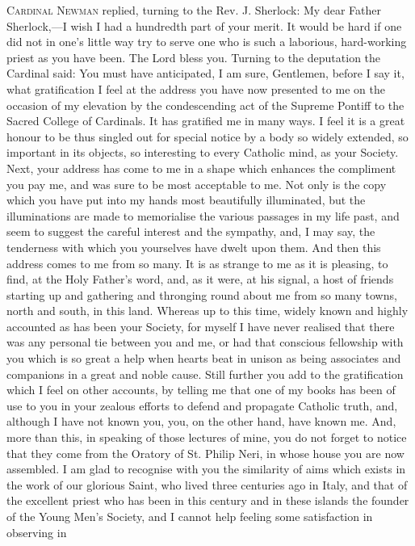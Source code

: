 C\textsc{ardinal} N\textsc{ewman}
replied, turning to the Rev. J. Sherlock: My dear Father Sherlock,—I
wish I had a hundredth part of your merit. It would be hard if one did
not in one's little way try to serve one who is such a laborious,
hard-working priest as you have been. The Lord bless you. Turning to
the deputation the Cardinal said: You must have anticipated, I am
sure, Gentlemen, before I say it, what gratification I feel at the
address you have now presented to me on the occasion of my elevation
by the condescending act of the Supreme Pontiff to the Sacred College
of Cardinals. It has gratified me in many ways. I feel it is a great
honour to be thus singled out for special notice by a body so widely
extended, so important in its objects, so interesting to every
Catholic mind, as your Society. Next, your address has come to me in a
shape which enhances the compliment you pay me, and was sure to be
most acceptable to me. Not only is the copy which you have put into my
hands most beautifully illuminated, but the illuminations are made to
memorialise the various passages in my life past, and seem to suggest
the careful interest and the sympathy, and, I may say, the tenderness
with which you yourselves have dwelt upon them. And then this address
comes to me from so many. It is as strange to me as it is pleasing, to
find, at the Holy Father's word, and, as it were, at his signal, a
host of friends starting up and gathering and thronging round about me
from so many towns, north and south, in this land. Whereas up to this
time, widely known and highly accounted as has been your Society, for
myself I have never realised that there was any personal tie between
you and me, or had that conscious fellowship with you which is so
great a help when hearts beat in unison as being associates and
companions in a great and noble cause. Still further you add to the
gratification which I feel on other accounts, by telling me that
one of my books has been of use to you in your zealous efforts to
defend and propagate Catholic truth, and, although I have not known
you, you, on the other hand, have known me. And, more than this, in
speaking of those lectures of mine, you do not forget to notice that
they come from the Oratory of St. Philip Neri, in whose house you are
now assembled. I am glad to recognise with you the similarity of aims
which exists in the work of our glorious Saint, who lived three
centuries ago in Italy, and that of the excellent priest who has been
in this century and in these islands the founder of the Young Men's
Society, and I cannot help feeling some satisfaction in observing in
